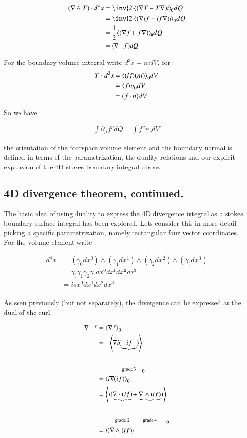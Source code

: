\begin{align*}
(\grad \wedge T) \cdot d^4 x
&=
\inv{2} \gpgradezero{ (\grad T - T \grad) i } dQ \\
&=
\inv{2} \gpgradezero{ (\grad i f - if \grad) i } dQ \\
&=
\frac{1}{2} \gpgradezero{ (\grad f + f \grad) } dQ \\
&=
(\grad \cdot f) dQ
\end{align*}

For the boundary volume integral write $d^3 x = n i dV$, for
\begin{align*}
T \cdot d^3 x 
&= 
{\left\langle{{ (if) ( n i ) }}\right\rangle}_{0} dV \\
&= 
{\left\langle{{ f n }}\right\rangle}_{0} dV \\
&= 
(f \cdot n) dV
\end{align*}

So we have

\begin{align*}
\int \partial_\mu f^\mu dQ = \int f^\nu n_\nu dV
\end{align*}

the orientation of the fourspace volume element and the boundary normal is defined in terms of the parametrization, the duality relations and our explicit expansion of the 4D stokes boundary integral above.

\subsection{4D divergence theorem, continued.}

The basic idea of using duality to express the 4D divergence integral as a stokes boundary surface integral has been explored.  Lets consider this in more detail picking a specific parametrization, namely rectangular four vector coordinates.  For the volume element write

\begin{align*}
d^4 x 
&= ( \gamma_0 dx^0 ) \wedge ( \gamma_1 dx^1 ) \wedge ( \gamma_2 dx^2 ) \wedge ( \gamma_3 dx^3 ) \\
&= \gamma_0 \gamma_1 \gamma_2 \gamma_3 dx^0 dx^1 dx^2 dx^3 \\
&= i dx^0 dx^1 dx^2 dx^3 \\
\end{align*}

As seen previously (but not separately), the divergence can be expressed as the dual of the curl

\begin{align*}
\nabla \cdot f
&=
{\left\langle{{ \nabla f }}\right\rangle}_{0} \\
&=
-{\left\langle{{ \nabla i (\underbrace{i f}_{\text{grade 3}}) }}\right\rangle}_{0} \\
&=
{\left\langle{{ i \nabla(i f) }}\right\rangle}_{0} \\
&=
{\left\langle{{ i ( \underbrace{\nabla\cdot (i f)}_{\text{grade 2}} + \underbrace{\nabla\wedge (i f)}_{\text{grade 4}} ) }}\right\rangle}_{0} \\
&=
i (\nabla \wedge (i f)) \\
\end{align*}

